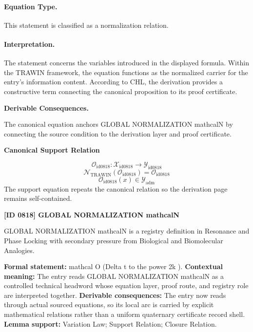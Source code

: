 \paragraph{Equation Type.}
This statement is classified as a normalization relation.

\paragraph{Interpretation.}
The statement concerns the variables introduced in the displayed formula. Within the TRAWIN framework, the equation functions as the normalized carrier for the entry’s information content. According to CHL, the derivation provides a constructive term connecting the canonical proposition to its proof certificate.

\par\vspace{0.35em}
\noindent\textbf{Derivable Consequences.}\quad
\begingroup
\footnotesize
\raggedright
The canonical equation anchors GLOBAL NORMALIZATION mathcalN by connecting the source condition to the derivation layer and proof certificate.
\par\endgroup

\noindent\textbf{Canonical Support Relation}\par
\[
\mathcal{O}_{\mathrm{id0818}}:\mathcal{X}_{\mathrm{id0818}}\longrightarrow\mathcal{Y}_{\mathrm{id0818}}
\]
\[
\mathcal{N}_{\mathrm{TRAWIN}}(\mathcal{O}_{\mathrm{id0818}})=\mathcal{O}_{\mathrm{id0818}}
\]
\[
\mathcal{O}_{\mathrm{id0818}}(x)\in\mathcal{Y}_{\mathrm{adm}}
\]
\noindent The support equation repeats the canonical relation so the derivation page remains self-contained.\par

\clearpage
\noindent\textbf{[ID 0818] GLOBAL NORMALIZATION mathcalN}\par
\vspace{0.35em}
\begingroup\small
{}
GLOBAL NORMALIZATION mathcalN is a registry definition in Resonance and Phase Locking with secondary pressure from Biological and Biomolecular Analogies.

\begingroup\footnotesize\setlength{\emergencystretch}{3em}\sloppy
\textbf{Formal statement:} mathcal O (Delta t to the power 2k ). \textbf{Contextual meaning:} The entry reads GLOBAL NORMALIZATION mathcalN as a controlled technical headword whose equation layer, proof route, and registry role are interpreted together. \textbf{Derivable consequences:} The entry now reads through actual sourced equations, so its local arc is carried by explicit mathematical relations rather than a uniform quaternary certificate record shell. \textbf{Lemma support:} Variation Law; Support Relation; Closure Relation.\par
\endgroup


